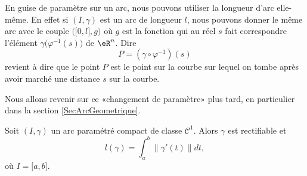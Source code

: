 En guise de paramètre sur un arc, nous pouvons utiliser la longueur d'arc elle-même. En effet si $(I,\gamma)$ est un arc de longueur $l$, nous pouvons donner le même arc avec le couple $\big( \mathopen[ 0 , l \mathclose],g \big)$ où $g$ est la fonction qui au réel $s$ fait correspondre l'élément $\gamma\big( \varphi^{-1}(s) \big)$ de $\eR^n$. Dire
\begin{equation}
    P=(\gamma\circ\varphi^{-1})(s)
\end{equation}
revient à dire que le point $P$ est le point sur la courbe sur lequel on tombe après avoir marché une distance $s$ sur la courbe.

Nous allons revenir sur ce «changement de paramètre» plus tard, en particulier dans la section \ref{SecArcGeometrique}.


\begin{theorem}     \label{ThoLongueurIntegrale}
    Soit $(I,\gamma)$ un arc paramétré compact de classe $\mathcal{C}^1$. Alors $\gamma$ est rectifiable et
    \begin{equation}        \label{EqLongGammalInt}
        l(\gamma)=\int_a^b\| \gamma'(t) \|dt,
    \end{equation}
    où $I=\mathopen[ a , b \mathclose]$.
\end{theorem}

